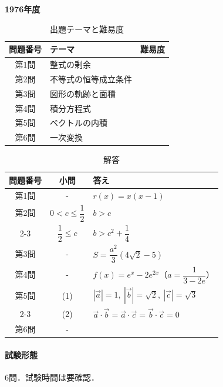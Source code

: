\documentclass[../../main.tex]{subfiles}
\begin{document}
\begin{center}
  {\fontsize{48pt}{58pt}\selectfont \textbf{1976}\normalsize\textbf{年度}}
\end{center}

\begin{table}[htb]
  \centering
  \caption{出題テーマと難易度}
  \begin{tabular}{|c|p{9cm}|c|}
    \hline
    \textbf{問題番号} & \textbf{テーマ} & \textbf{難易度} \\
    \hline
    第1問 & 整式の剰余 & \\
    \hline
    第2問 & 不等式の恒等成立条件 & \\
    \hline
    第3問 & 図形の軌跡と面積 & \\
    \hline
    第4問 & 積分方程式 & \\
    \hline
    第5問 & ベクトルの内積 & \\
    \hline
    第6問 & 一次変換 & \\
    \hline
  \end{tabular}
\end{table}

\begin{table}[htb]
  \centering
  \caption{解答}
  \renewcommand{\arraystretch}{1.4}
  \begin{tabular}{|c|c|p{9cm}|}
    \hline
    \textbf{問題番号} & \textbf{小問} & \textbf{答え} \\
    \hline
    第1問 & - & $r(x)=x(x-1)$ \\
    \hline
    第2問 & $0<c\le\dfrac{1}{2}$ & $b>c$ \\
    \cline{2-3}
    & $\dfrac{1}{2}\le c$ & $b>c^2+\dfrac{1}{4}$ \\
    \hline
    第3問 & - & $S=\dfrac{a^2}{3}(4\sqrt{2}-5)$ \\
    \hline
    第4問 & - & $f(x)=e^x-2e^{2x}$（$a=\dfrac{1}{3-2e}$） \\
    \hline
    第5問 & (1) & $|\vec a|=1,\ |\vec b|=\sqrt{2},\ |\vec c|=\sqrt{3}$ \\
    \cline{2-3}
    & (2) & $\vec a\cdot\vec b=\vec a\cdot\vec c=\vec b\cdot\vec c=0$ \\
    \hline
    第6問 & - &  \\
    \hline
  \end{tabular}
\end{table}

\paragraph{試験形態}
6問．試験時間は要確認．
\end{document}
